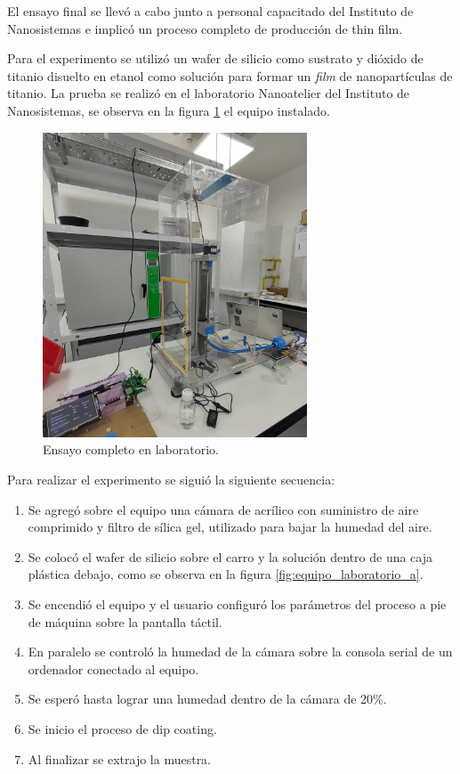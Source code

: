 El ensayo final se llevó a cabo junto a personal capacitado del Instituto de Nanosistemas e implicó un proceso completo de producción de thin film.

Para el experimento se utilizó  un wafer de silicio como sustrato y dióxido de titanio disuelto en etanol como solución para formar un \textit{film} de nanopartículas de titanio. La prueba se realizó en el laboratorio Nanoatelier del Instituto de Nanosistemas, se observa en la figura \ref{fig:equipo_laboratorio} el equipo instalado.


\begin{figure}[h!]
\centering 
\includegraphics[width=0.7\textwidth]{./Figures/prueba_b.jpg}
\caption{Ensayo completo en laboratorio.}
\label{fig:equipo_laboratorio}
\end{figure}


Para realizar el experimento se siguió la siguiente secuencia:
\begin{enumerate}
\item Se agregó sobre el equipo una cámara de acrílico con suministro de aire comprimido y filtro de sílica gel, utilizado para bajar la humedad del aire.
\item Se colocó el wafer de silicio sobre el carro y la solución dentro de una caja plástica debajo, como se observa en la figura \ref{fig:equipo_laboratorio_a}.
\item Se encendió el equipo y el usuario configuró los parámetros del proceso a pie de máquina sobre la pantalla táctil.
\item En paralelo se controló la humedad de la cámara sobre la consola serial de un ordenador conectado al equipo.
\item Se esperó hasta lograr una humedad dentro de la cámara de 20\%.
\item Se inicio el proceso de dip coating.
\item Al finalizar se extrajo la muestra.
\end{enumerate}


